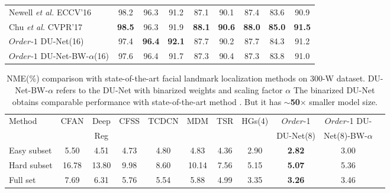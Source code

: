 \begin{table}[t!]
\begin{center}
\begin{tabular}{@{}lcccccccc@{}}
Newell {\it et al.}  ECCV'16 \cite{newell2016stacked} & 98.2 & 96.3 & 91.2 & 87.1 & 90.1 & 87.4 & 83.6 & 90.9\\
Chu \textit{et al.} CVPR'17 \cite{chu2017multi} & {\bf 98.5} & 96.3 & 91.9 & {\bf 88.1} & {\bf 90.6} & {\bf 88.0} & {\bf 85.0} & {\bf 91.5}\\
\hline
$Order$-$1$ DU-Net(16) & 97.4  & {\bf 96.4}  & {\bf 92.1}  & 87.7  & 90.2  & 87.7 & 84.3 & 91.2\\
$Order$-$1$ DU-Net-BW-$\alpha$(16) & 97.6  & 96.4  & 91.7  & 87.3  & 90.4  & 87.3 & 83.8 & 91.0\\
\bottomrule
\end{tabular}
\end{center}
\end{table}

\begin{table}[t]
\begin{center}
\caption{NME(\%) comparison with state-of-the-art facial landmark localization methods on 300-W dataset. DU-Net-BW-$\alpha$ refers to the DU-Net with binarized weights and scaling factor $\alpha$ The binarized DU-Net obtains comparable performance with state-of-the-art method \cite{newell2016stacked}. But it has $\sim${\bf 50}$\times$ smaller model size.}\label{tb:300w}
\small
\setlength\tabcolsep{0.5pt}
\begin{tabular}{lccccccc|ccc}
\toprule
\multirow{2}{*}{Method} & CFAN  & Deep  & CFSS  
& TCDCN  & MDM  & TSR & HGs(4) & $Order$-1 & $Order$-1 DU-\\
& \cite{zhang2014coarse} & Reg \cite{shi2014deep} & \cite{zhu2015face} & \cite{zhang2014facial} &  \cite{trigeorgis2016mnemonic} & \cite{lv2017deep} & \cite{newell2016stacked} & DU-Net(8)& Net(8)-BW-$\alpha$\\
\hline
Easy subset  & 5.50 & 4.51  &  4.73 & 4.80 & 4.83  & 4.36 & 2.90 & {\bf 2.82} & 3.00\\ 
Hard subset  & 16.78 &  13.80  & 9.98 & 8.60 & 10.14 &  7.56 & 5.15 &{\bf 5.07} & 5.36\\
Full set   & 7.69 & 6.31 & 5.76 & 5.54 & 5.88 & 4.99 & 3.35 & {\bf 3.26} & 3.46\\
\bottomrule
\end{tabular}
\end{center}
\end{table}

